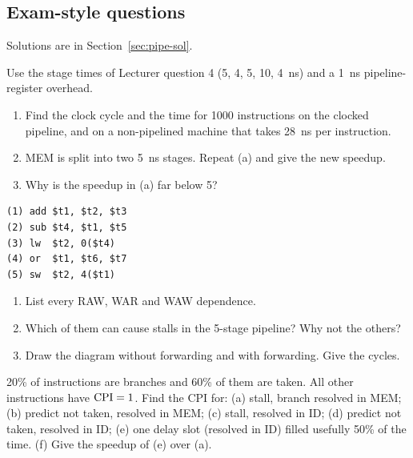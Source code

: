 \subsection{Exam-style questions}
Solutions are in Section~\ref{sec:pipe-sol}.

\begin{exercise}\label{q:pipe-clock}
Use the stage times of Lecturer question 4 (5, 4, 5, 10, 4~ns) and a 1~ns
pipeline-register overhead.
\begin{enumerate}[label=(\alph*),leftmargin=*]
  \item Find the clock cycle and the time for 1000 instructions on the clocked
  pipeline, and on a non-pipelined machine that takes 28~ns per instruction.
  \item MEM is split into two 5~ns stages. Repeat (a) and give the new speedup.
  \item Why is the speedup in (a) far below 5?
\end{enumerate}
\end{exercise}

\begin{exercise}\label{q:pipe-hz}
\leavevmode
\begin{lstlisting}
(1) add $t1, $t2, $t3
(2) sub $t4, $t1, $t5
(3) lw  $t2, 0($t4)
(4) or  $t1, $t6, $t7
(5) sw  $t2, 4($t1)
\end{lstlisting}
\begin{enumerate}[label=(\alph*),leftmargin=*]
  \item List every RAW, WAR and WAW dependence.
  \item Which of them can cause stalls in the 5-stage pipeline? Why not the others?
  \item Draw the diagram without forwarding and with forwarding. Give the cycles.
\end{enumerate}
\end{exercise}

\begin{exercise}\label{q:pipe-br}
20\% of instructions are branches and 60\% of them are taken. All other
instructions have $\mathrm{CPI}=1$. Find the CPI for:
(a) stall, branch resolved in MEM;
(b) predict not taken, resolved in MEM;
(c) stall, resolved in ID;
(d) predict not taken, resolved in ID;
(e) one delay slot (resolved in ID) filled usefully 50\% of the time.
(f) Give the speedup of (e) over (a).
\end{exercise}

